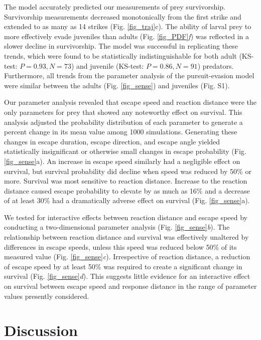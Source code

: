 \documentclass[]{rsos}%
\begin{document}
The model accurately predicted our measurements of prey survivorship. 
Survivorship measurements decreased monotonically from the first strike and extended to as many as 14 strikes (Fig. \ref{fig_traj}c).
The ability of larval prey to more effectively evade juveniles than adults (Fig. \ref{fig_PDF}\textit{f}) was reflected in a slower decline in survivorship.
The model was successful in replicating these trends, which were found to be statistically indistinguishable for both adult (KS-test: $P = 0.93, N = 73$) and juvenile (KS-test: $P = 0.86, N = 91$) predators. 
Furthermore, all trends from the parameter analysis of the pursuit-evasion model were similar between the adults (Fig. \ref{fig_sense}) and juveniles (Fig. S1). 

Our parameter analysis revealed that escape speed and reaction distance were the only parameters for prey that showed any noteworthy effect on survival. 
This analysis adjusted the probability distribution of each parameter to generate a percent change in its mean value among 1000 simulations.
Generating these changes in escape duration, escape direction, and escape angle yielded statistically insignificant or otherwise small changes in escape probability (Fig. \ref{fig_sense}a). 
An increase in escape speed similarly had a negligible effect on survival, but survival probability did decline when speed was reduced by 50\% or more.
Survival was most sensitive to reaction distance.
Increase to the reaction distance caused escape probability to elevate by as much as 16\% and a decrease of at least 30\% had a dramatically adverse effect on survival (Fig. \ref{fig_sense}a). 

We tested for interactive effects between reaction distance and escape speed by conducting a two-dimensional parameter analysis (Fig. \ref{fig_sense}\textit{b}).
The relationship between reaction distance and survival was effectively unaltered by differences in escape speeds, unless this speed was reduced below 50\% of its measured value (Fig. \ref{fig_sense}\textit{c}).
Irrespective of reaction distance, a reduction of escape speed by at least 50\% was required to create a significant change in survival (Fig. \ref{fig_sense}\textit{d}).
This suggests little evidence for an interactive effect on survival between escape speed and response distance in the range of parameter values presently considered.


\section{Discussion}%
\end{document}
